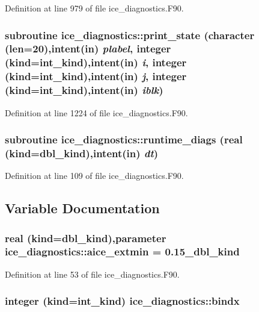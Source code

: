 Definition at line 979 of file ice\_\-diagnostics.F90.\hypertarget{namespaceice__diagnostics_adbff5d6397108c366de11a71a997b9eb}{
\subsubsection[{print\_\-state}]{\setlength{\rightskip}{0pt plus 5cm}subroutine ice\_\-diagnostics::print\_\-state (character (len=20),intent(in) {\em plabel}, \/  integer (kind=int\_\-kind),intent(in) {\em i}, \/  integer (kind=int\_\-kind),intent(in) {\em j}, \/  integer (kind=int\_\-kind),intent(in) {\em iblk})}}
\label{namespaceice__diagnostics_adbff5d6397108c366de11a71a997b9eb}


Definition at line 1224 of file ice\_\-diagnostics.F90.\hypertarget{namespaceice__diagnostics_a29d618a92dc5fe3345aad30da147f0b1}{
\subsubsection[{runtime\_\-diags}]{\setlength{\rightskip}{0pt plus 5cm}subroutine ice\_\-diagnostics::runtime\_\-diags (real (kind=dbl\_\-kind),intent(in) {\em dt})}}
\label{namespaceice__diagnostics_a29d618a92dc5fe3345aad30da147f0b1}


Definition at line 109 of file ice\_\-diagnostics.F90.

\subsection{Variable Documentation}
\hypertarget{namespaceice__diagnostics_aabe1b0ea631c03eded45a36cdd99fd21}{
\subsubsection[{aice\_\-extmin}]{\setlength{\rightskip}{0pt plus 5cm}real (kind=dbl\_\-kind),parameter {\bf ice\_\-diagnostics::aice\_\-extmin} = 0.15\_\-dbl\_\-kind}}
\label{namespaceice__diagnostics_aabe1b0ea631c03eded45a36cdd99fd21}


Definition at line 53 of file ice\_\-diagnostics.F90.\hypertarget{namespaceice__diagnostics_a531e9ef9082091f153db74c9a1816c12}{
\subsubsection[{bindx}]{\setlength{\rightskip}{0pt plus 5cm}integer (kind=int\_\-kind) {\bf ice\_\-diagnostics::bindx}}}
\label{namespaceice__diagnostics_a531e9ef9082091f153db74c9a1816c12}


